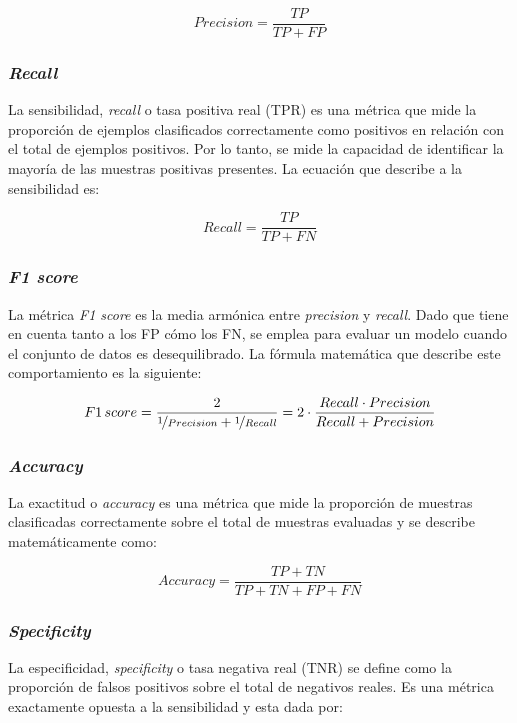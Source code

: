 \begin{equation}
	\label{eq:precision}
	Precision = \frac{TP}{TP + FP}
\end{equation}


\subsubsection{\emph{Recall}}
La sensibilidad, \emph{recall} o tasa positiva real (TPR) es una métrica que mide la proporción de ejemplos 
clasificados correctamente como positivos en relación con el total de ejemplos positivos. Por lo tanto, se 
mide la capacidad de identificar la mayoría de las muestras positivas presentes. La ecuación que describe 
a la sensibilidad es:

\begin{equation}
	\label{eq:recall}
	Recall = \frac{TP}{TP + FN}
\end{equation}


\subsubsection{\emph{F1 score}}
La métrica \emph{F1 score} es la media armónica entre \emph{precision} y \emph{recall}. Dado que tiene 
en cuenta tanto a los FP cómo los FN, se emplea para evaluar un modelo cuando el conjunto de datos es 
desequilibrado. La fórmula matemática que describe este comportamiento es la siguiente:

\begin{equation}
	\label{eq:f1score}
	F1\,score = \frac{2}{\nicefrac{1}{Precision} + \nicefrac{1}{Recall}} = 2\cdot\frac{Recall \cdot Precision}{Recall + Precision}
\end{equation}

\subsubsection{\emph{Accuracy}}
La exactitud o \emph{accuracy} es una métrica que mide la proporción de muestras clasificadas correctamente 
sobre el total de muestras evaluadas y se describe matemáticamente como:

\begin{equation}
	\label{eq:accuracy}
	Accuracy = \frac{TP + TN}{TP + TN + FP + FN}
\end{equation}

\subsubsection{\emph{Specificity}}
La especificidad, \emph{specificity} o tasa negativa real (TNR) se define como la proporción de falsos positivos 
sobre el total de negativos reales. Es una métrica exactamente opuesta a la sensibilidad y esta dada por:

